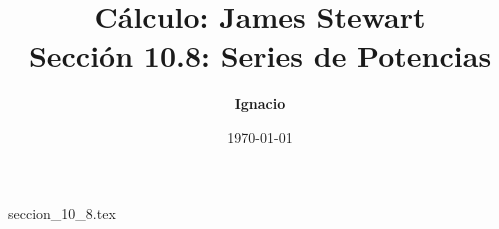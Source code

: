 \documentclass[11pt,spanish,oneside]{report}
\title{\textbf{Cálculo: James Stewart} \\ \Large Sección 10.8: Series de Potencias}
\author{\textbf{Ignacio}}
\date{\today}
\begin{document}
\maketitle

{seccion_10_8.tex}
\end{document}
